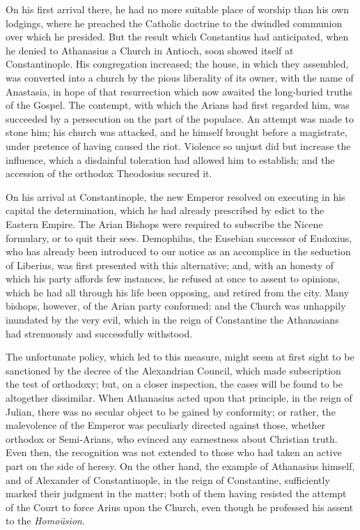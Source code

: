 On his first arrival there, he had no more suitable place of
worship than his own lodgings, where he preached the Catholic doctrine
to the dwindled communion over which he presided. But the result which
Constantius had anticipated, when he denied to Athanasius a Church in
Antioch, soon showed itself at Constantinople. His congregation
increased; the house, in which they assembled, was converted into a
church by the pious liberality of its owner, with the name of
Anastasia, in hope of that resurrection which now awaited the
long-buried truths of the Gospel. The contempt, with which the Arians
had first regarded him, was succeeded by a persecution on the part of
the populace. An attempt was made to stone him; his church was
attacked, and he himself brought before a magistrate, under pretence
of having caused the riot. Violence so unjust did but increase the
influence, which a disdainful toleration had allowed him to establish;
and the accession of the orthodox Theodosius secured it.

On his arrival at Constantinople, the new Emperor resolved on
executing in his capital the determination, which he had already
prescribed by edict to the Eastern Empire. The Arian Bishops were
required to subscribe the Nicene formulary, or to quit their sees.
Demophilus, the Eusebian successor of Eudoxius, who has already been
introduced to our notice as an accomplice in the seduction of Liberius,
was first presented with this alternative; and, with an honesty of
which his party affords few instances, he refused at once to assent to
opinions, which he had all through his life been opposing, and retired
from the city. Many bishops, however, of the Arian party conformed;
and the Church was unhappily inundated by the very evil, which
in the reign of Constantine the Athanasians had strenuously and
successfully withstood.

The unfortunate policy, which led to this measure, might seem at
first sight to be sanctioned by the decree of the Alexandrian Council,
which made subscription the test of orthodoxy; but, on a closer
inspection, the cases will be found to be altogether dissimilar. When
Athanasius acted upon that principle, in the reign of Julian, there
was no secular object to be gained by conformity; or rather, the
malevolence of the Emperor was peculiarly directed against those,
whether orthodox or Semi-Arians, who evinced any earnestness about
Christian truth. Even then, the recognition was not extended to those
who had taken an active part on the side of heresy. On the other hand,
the example of Athanasius himself, and of Alexander of Constantinople,
in the reign of Constantine, sufficiently marked their judgment in the
matter; both of them having resisted the attempt of the Court to force
Arius upon the Church, even though he professed his assent to the \emph{Homoüsion}.

